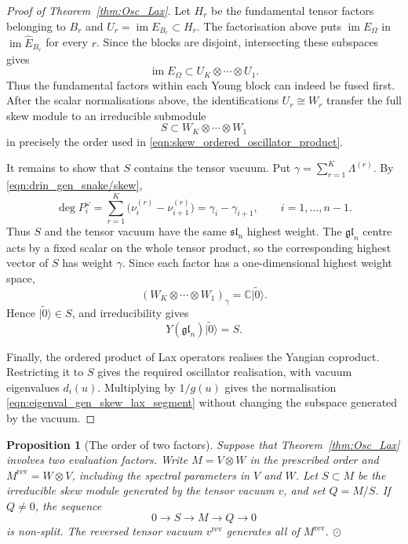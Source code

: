 \documentclass[12pt,reqno]{amsart}
\newcommand{\ket}[1]{{| #1 \rangle}}      %
\newcommand{\C}{{\mathbb C}}
\numberwithin{equation}{section}
\newtheorem{prop}[thm]{Proposition}
\begin{document}
\begin{proof}[Proof of Theorem~\ref{thm:Osc_Lax}]
	Let $H_r$ be the fundamental tensor factors belonging to $B_r$
	and $U_r=\operatorname{im}E_{B_r}\subset H_r$. The factorisation
	above puts $\operatorname{im}E_\Omega$ in
	$\operatorname{im}\widehat E_{B_r}$ for every $r$.
	Since the blocks are disjoint, intersecting these subspaces gives
	\begin{equation*}
		\operatorname{im}E_\Omega
		\subset U_K\otimes\cdots\otimes U_1.
	\end{equation*}
	Thus the fundamental factors within each Young block can indeed
	be fused first. After the scalar normalisations above, the
	identifications $U_r\cong W_r$ transfer the full skew module to
	an irreducible submodule
	\begin{equation*}
		S\subset W_K\otimes\cdots\otimes W_1
	\end{equation*}
	in precisely the order used in
	\eqref{eqn:skew_ordered_oscillator_product}.
	
	It remains to show that $S$ contains the tensor vacuum.
	Put $\gamma=\sum_{r=1}^K\Lambda^{(r)}$. By
	\eqref{eqn:drin_gen_snake/skew},
	\begin{equation*}
		\deg P_i^\omega
		=\sum_{r=1}^K\bigl(\nu_i^{(r)}-\nu_{i+1}^{(r)}\bigr)
		=\gamma_i-\gamma_{i+1},
		\qquad i=1,\ldots,n-1.
	\end{equation*}
	Thus $S$ and the tensor vacuum have the same
	$\mathfrak{sl}_n$ highest weight. The $\mathfrak{gl}_n$ centre
	acts by a fixed scalar on the whole tensor product, so the
	corresponding highest vector of $S$ has weight $\gamma$.
	Since each factor has a one-dimensional highest weight space,
	\begin{equation*}
		(W_K\otimes\cdots\otimes W_1)_\gamma
		=\C\ket{\widetilde0}.
	\end{equation*}
	Hence $\ket{\widetilde0}\in S$, and irreducibility gives
	\begin{equation*}
		Y(\mathfrak{gl}_n)\ket{\widetilde0}=S.
	\end{equation*}
	
	Finally, the ordered product of Lax operators realises the
	Yangian coproduct. Restricting it to $S$ gives the required
	oscillator realisation, with vacuum eigenvalues $d_i(u)$.
	Multiplying by $1/g(u)$ gives the normalisation
	\eqref{eqn:eigenval_gen_skew_lax_segment} without changing the
	subspace generated by the vacuum.
\end{proof}

\begin{prop}[The order of two factors]
\label{rem:reversed_fusion_order}
Suppose that Theorem~\ref{thm:Osc_Lax} involves two evaluation
factors. Write $M=V\otimes W$ in the prescribed order and
$M^{\mathrm{rev}}=W\otimes V$, including the spectral parameters
in $V$ and $W$. Let $S\subset M$ be the irreducible skew module
generated by the tensor vacuum $v$, and set $Q=M/S$.
If $Q\neq0$, the sequence
\begin{equation*}
    0\longrightarrow S\longrightarrow M\longrightarrow Q
    \longrightarrow0
\end{equation*}
is non-split. The reversed tensor vacuum $v^{\mathrm{rev}}$
generates all of $M^{\mathrm{rev}}$. $\odot$
\end{prop}
\end{document}
